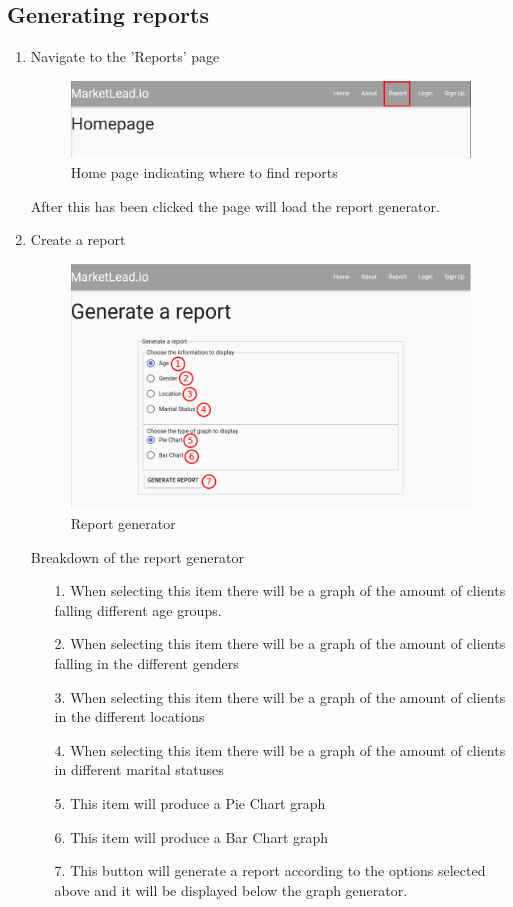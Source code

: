 \documentclass{article}
\begin{document}
		\subsection{Generating reports}
			\begin{enumerate}
				\item Navigate to the 'Reports' page
					\begin{figure}[H]
						\centering
							\includegraphics[width=\textwidth]{images/home_reports.png}
						\caption{Home page indicating where to find reports}
						\label{fig:homeReports}
					\end{figure}
					After this has been clicked the page will load the report generator.
				\item Create a report
					\begin{figure}[H]
						\centering
							\includegraphics[width=\textwidth]{images/generate_report.png}
						\caption{Report generator}
						\label{fig:reportGenerator}
					\end{figure}
					Breakdown of the report generator
					\begin{itemize}
						\item[1.] When selecting this item there will be a graph of the amount of clients falling different age groups.
						\item[2.] When selecting this item there will be a graph of the amount of clients falling in the different genders
						\item[3.] When selecting this item there will be a graph of the amount of clients in the different locations
						\item[4.] When selecting this item there will be a graph of the amount of clients in different marital statuses
						\item[5.] This item will produce a Pie Chart graph
						\item[6.] This item will produce a Bar Chart graph
						\item[7.] This button will generate a report according to the options selected above and it will be displayed below the graph generator.
					\end{itemize}
			\end{enumerate}
	
\end{document}
